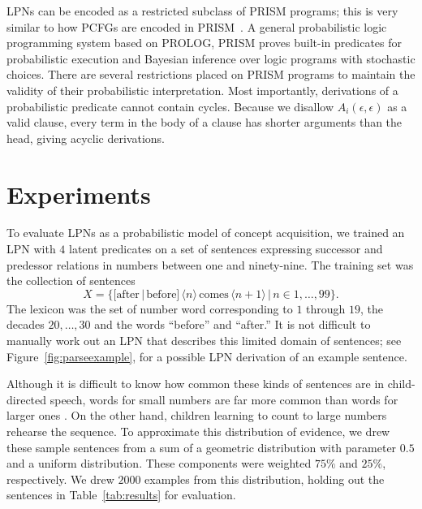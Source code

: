 \documentclass[10pt, twocolumn]{article}
\begin{document}
LPNs can be encoded as a restricted subclass of PRISM programs; this
is very similar to how PCFGs are encoded in
PRISM~\cite{DBLP:conf/cl/2000}. A general probabilistic logic
programming system based on PROLOG, PRISM proves built-in predicates
for probabilistic execution and Bayesian inference over logic programs
with stochastic choices. There are several
restrictions placed on PRISM programs to maintain the validity of
their probabilistic interpretation. Most importantly, derivations of a
probabilistic predicate cannot contain cycles. Because we disallow
$A_i(\epsilon,\epsilon)$ as a valid clause, every term in the body of a clause
has shorter arguments than the head, giving acyclic derivations.


\section{Experiments}

To evaluate LPNs as a probabilistic model of concept acquisition, we
trained an LPN with $4$ latent predicates on a set of sentences
expressing successor and predessor relations in numbers between one
and ninety-nine. The training set was the collection of sentences $$X
= \{[\text{after}\, | \, \text{before}] \, \langle n \rangle \,
\text{comes} \, \langle n+1 \rangle \,|\, n \in 1,\dots,99\}.$$ The
lexicon was the set of number word corresponding to $1$ through $19$,
the decades $20, \dots, 30$ and the words ``before'' and ``after.'' It
is not difficult to manually work out an LPN that describes this
limited domain of sentences; see Figure~\ref{fig:parseexample}, for a
possible LPN derivation of an example sentence.

Although it is difficult to know how common these kinds of sentences
are in child-directed speech, words for small numbers are far more
common than words for larger ones \cite{macwhinney2000childes}. On the
other hand, children learning to count to large numbers rehearse the
sequence. To approximate this distribution of evidence, we drew these
sample sentences from a sum of a geometric distribution with parameter
$0.5$ and a uniform distribution. These components were weighted
$75\%$ and $25\%$, respectively. We drew $2000$ examples from this
distribution, holding out the sentences in Table~\ref{tab:results} for
evaluation.
\end{document}
